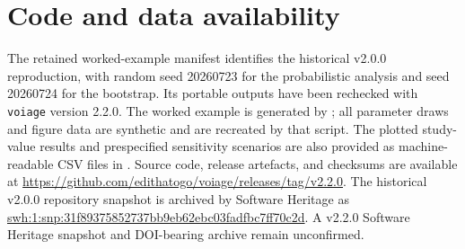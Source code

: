 \section*{Code and data availability}

The retained worked-example manifest identifies the historical v2.0.0
reproduction, with random seed 20260723 for the probabilistic analysis and
seed 20260724 for the bootstrap. Its portable outputs have been rechecked
with \texttt{voiage} version 2.2.0. The worked example
is generated by
; all parameter draws and
figure data are synthetic and are recreated by that script. The plotted
study-value results and prespecified sensitivity scenarios are also provided
as machine-readable CSV files in . Source code, release
artefacts, and checksums are available at
\url{https://github.com/edithatogo/voiage/releases/tag/v2.2.0}. The historical
v2.0.0 repository snapshot is archived by Software Heritage as
\url{swh:1:snp:31f89375852737bb9eb62ebc03fadfbc7ff70c2d}. A v2.2.0 Software
Heritage snapshot and DOI-bearing archive remain unconfirmed.
